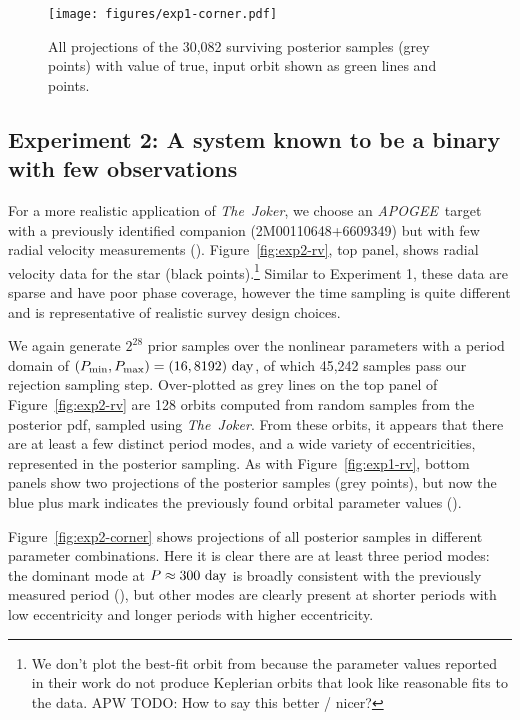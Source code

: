 \documentclass[manuscript, letterpaper]{aastex6}
\newcommand{\project}[1]{\textsl{#1}}
\newcommand{\acronym}[1]{{\small{#1}}}
\newcommand{\apogee}{\project{\acronym{APOGEE}}}
\newcommand{\samplername}{\project{The~Joker}}
\newcommand{\figname}{Figure}
\newcommand{\todoapw}[1]{{\color{red}APW TODO: #1}}
\begin{document}
\begin{figure}[p]
\begin{center}
\texttt{[image: figures/exp1-corner.pdf]}
\end{center}
\caption{%
All projections of the 30,082 surviving posterior samples (grey points) with
value of true, input orbit shown as green lines and points.
\label{fig:exp1-corner}}
\end{figure}

\subsection{Experiment 2: A system known to be a binary with few observations}

For a more realistic application of \samplername, we choose an \apogee\ target
with a previously identified companion (2M00110648+6609349) but with few radial
velocity measurements (\citealt{Troup:2016}).
\figname~\ref{fig:exp2-rv}, top panel, shows radial velocity data for the star
(black points).\footnote{We don't plot the best-fit orbit from
\citealt{Troup:2016} because the parameter values reported in their work do not
produce Keplerian orbits that look like reasonable fits to the data.
\todoapw{How to say this better / nicer?}}
Similar to Experiment 1, these data are sparse and have poor phase coverage,
however the time sampling is quite different and is representative of realistic
survey design choices.

We again generate $2^{28}$ prior samples over the nonlinear parameters with a
period domain of $(P_{\rm min}, P_{\rm max}) = (16, 8192)~{\rm day}$, of which
45,242 samples pass our rejection sampling step.
Over-plotted as grey lines on the top panel of \figname~\ref{fig:exp2-rv} are
128 orbits computed from random samples from the posterior pdf, sampled using
\samplername.
From these orbits, it appears that there are at least a few distinct period
modes, and a wide variety of eccentricities, represented in the posterior
sampling.
As with \figname~\ref{fig:exp1-rv}, bottom panels show two projections of the
posterior samples (grey points), but now the blue plus mark indicates the
previously found orbital parameter values (\citealt{Troup:2016}).

\figname~\ref{fig:exp2-corner} shows projections of all posterior samples in
different parameter combinations.
Here it is clear there are at least three period modes: the dominant mode at $P
\approx 300~{\rm day}$ is broadly consistent with the previously measured period
(\citealt{Troup:2016}), but other modes are clearly present at shorter periods
with low eccentricity and longer periods with higher eccentricity.
\end{document}
